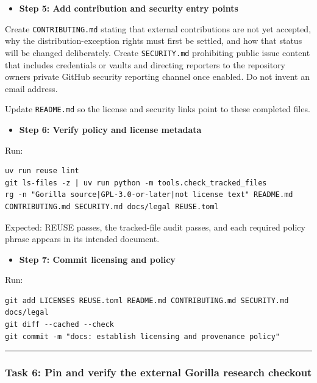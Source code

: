 \documentclass[
  letterpaper,
]{article}
\newcommand{\passthrough}[1]{#1}
\providecommand{\tightlist}{%
  \setlength{\itemsep}{0pt}\setlength{\parskip}{0pt}}
\begin{document}
\begin{itemize}
\tightlist
\item[$\boxtimes$]
  \textbf{Step 5: Add contribution and security entry points}
\end{itemize}

Create \nolinkurl{CONTRIBUTING.md} stating that external contributions are not yet accepted, why the
distribution-exception rights must first be settled, and how that status will be changed deliberately. Create
\nolinkurl{SECURITY.md} prohibiting public issue content that includes credentials or vaults and directing reporters to
the repository owner\textquotesingle s private GitHub security reporting channel once enabled. Do not invent an email
address.

Update \passthrough{\lstinline!README.md!} so the license and security links point to these completed files.

\begin{itemize}
\tightlist
\item[$\boxtimes$]
  \textbf{Step 6: Verify policy and license metadata}
\end{itemize}

Run:

\begin{lstlisting}
uv run reuse lint
git ls-files -z | uv run python -m tools.check_tracked_files
rg -n "Gorilla source|GPL-3.0-or-later|not license text" README.md CONTRIBUTING.md SECURITY.md docs/legal REUSE.toml
\end{lstlisting}

Expected: REUSE passes, the tracked-file audit passes, and each required policy phrase appears in its intended document.

\begin{itemize}
\tightlist
\item[$\boxtimes$]
  \textbf{Step 7: Commit licensing and policy}
\end{itemize}

Run:

\begin{lstlisting}
git add LICENSES REUSE.toml README.md CONTRIBUTING.md SECURITY.md docs/legal
git diff --cached --check
git commit -m "docs: establish licensing and provenance policy"
\end{lstlisting}

\begin{center}\rule{0.5\linewidth}{0.5pt}\end{center}

\subsubsection{Task 6: Pin and verify the external Gorilla research
checkout}\label{task-6-pin-and-verify-the-external-gorilla-research-checkout}
\end{document}
